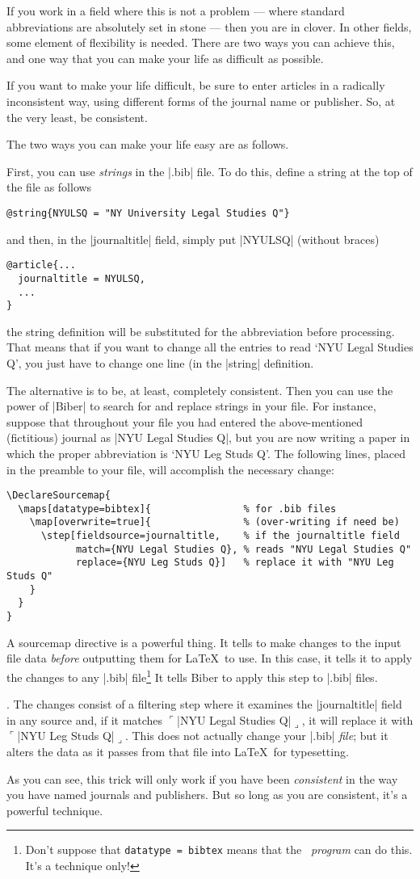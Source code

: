 {If you work in a field where this is not a problem --- where standard
abbreviations are absolutely set in stone --- then you are in
clover. In other fields, some element of flexibility is needed. There
are two ways you can achieve this, and one way that you can make your
life as difficult as possible.

If you want to make your life difficult, be sure to enter articles in
a radically inconsistent way, using different forms of the journal
name or publisher. So, at the very least, be consistent.

The two ways you can make your life easy are as follows.

First, you can use \emph{strings} in the |.bib| file. To do this,
define a string at the top of the file as follows
\begin{Verbatim}
@string{NYULSQ = "NY University Legal Studies Q"}
\end{Verbatim}
and then, in the |journaltitle| field, simply put |NYULSQ| (without braces)
\begin{Verbatim}
@article{...
  journaltitle = NYULSQ,
  ...
}
\end{Verbatim}
the string definition will be substituted for the abbreviation before
processing. That means that if you want to change all the entries to
read `NYU Legal Studies Q', you just have to change one line (in the
|string| definition.

The alternative is to be, at least, completely consistent. Then you
can use the power of |Biber| to search for and replace strings in your
file. For instance, suppose that throughout your file you had entered
the above-mentioned (fictitious) journal as |NYU Legal Studies Q|, but
you are now writing a paper in which the proper abbreviation is `NYU
Leg Studs Q'. The following lines, placed in the preamble to your
file, will accomplish the necessary change:\label{datamap}

\begin{Verbatim}
\DeclareSourcemap{
  \maps[datatype=bibtex]{                % for .bib files
    \map[overwrite=true]{                % (over-writing if need be)
      \step[fieldsource=journaltitle,    % if the journaltitle field
            match={NYU Legal Studies Q}, % reads "NYU Legal Studies Q"
            replace={NYU Leg Studs Q}]   % replace it with "NYU Leg Studs Q"
    }
  }
}
\end{Verbatim}

A sourcemap directive is a powerful thing. It tells  to make changes to the input
file data \emph{before} outputting them for \LaTeX\ to use. In this
case, it tells it to apply the changes to any |.bib|
file\footnote{Don't suppose that \texttt{datatype = bibtex} means that
  the \bibtex\ \emph{program} can do this. It's a 
  technique only!} It tells Biber to apply this step to |.bib|
files.}. The changes consist of a filtering step where it examines the
|journaltitle| field in any source and, if it matches $\ulcorner$|NYU
Legal Studies Q|$\lrcorner$, it will replace it with $\ulcorner$|NYU
Leg Studs Q|$\lrcorner$. This does not actually change your |.bib|
\emph{file}; but it alters the data as it passes from that file into
\LaTeX\ for typesetting.

As you can see, this trick will only work if you have been
\emph{consistent} in the way you have named journals and
publishers. But so long as you are consistent, it's a powerful
technique.
